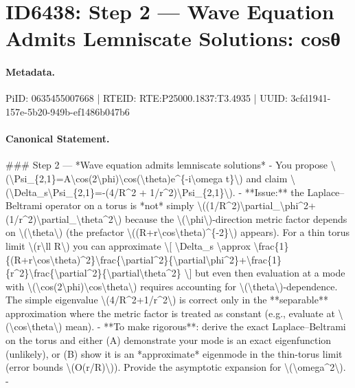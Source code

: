 \section*{ID6438: Step 2 — Wave Equation Admits Lemniscate Solutions: cosθ}
\paragraph{Metadata.}
PiID: 0635455007668 | RTEID: RTE:P25000.1837:T3.4935 | UUID: 3cfd1941-157e-5b20-949b-ef1486b047b6

\paragraph{Canonical Statement.}
\#\#\# Step 2 — *Wave equation admits lemniscate solutions* - You propose \textbackslash{}(\textbackslash{}Psi\_\{2,1\}=A\textbackslash{}cos(2\textbackslash{}phi)\textbackslash{}cos(\textbackslash{}theta)e\textasciicircum{}\{-i\textbackslash{}omega t\}\textbackslash{}) and claim \textbackslash{}(\textbackslash{}Delta\_s\textbackslash{}Psi\_\{2,1\}=-(4/R\textasciicircum{}2 + 1/r\textasciicircum{}2)\textbackslash{}Psi\_\{2,1\}\textbackslash{}). - **Issue:** the Laplace–Beltrami operator on a torus is *not* simply \textbackslash{}((1/R\textasciicircum{}2)\textbackslash{}partial\_\textbackslash{}phi\textasciicircum{}2+(1/r\textasciicircum{}2)\textbackslash{}partial\_\textbackslash{}theta\textasciicircum{}2\textbackslash{}) because the \textbackslash{}(\textbackslash{}phi\textbackslash{})-direction metric factor depends on \textbackslash{}(\textbackslash{}theta\textbackslash{}) (the prefactor \textbackslash{}((R+r\textbackslash{}cos\textbackslash{}theta)\textasciicircum{}\{-2\}\textbackslash{}) appears). For a thin torus limit \textbackslash{}(r\textbackslash{}ll R\textbackslash{}) you can approximate \textbackslash{}[ \textbackslash{}Delta\_s \textbackslash{}approx \textbackslash{}frac\{1\}\{(R+r\textbackslash{}cos\textbackslash{}theta)\textasciicircum{}2\}\textbackslash{}frac\{\textbackslash{}partial\textasciicircum{}2\}\{\textbackslash{}partial\textbackslash{}phi\textasciicircum{}2\}+\textbackslash{}frac\{1\}\{r\textasciicircum{}2\}\textbackslash{}frac\{\textbackslash{}partial\textasciicircum{}2\}\{\textbackslash{}partial\textbackslash{}theta\textasciicircum{}2\} \textbackslash{}] but even then evaluation at a mode with \textbackslash{}(\textbackslash{}cos(2\textbackslash{}phi)\textbackslash{}cos\textbackslash{}theta\textbackslash{}) requires accounting for \textbackslash{}(\textbackslash{}theta\textbackslash{})-dependence. The simple eigenvalue \textbackslash{}(4/R\textasciicircum{}2+1/r\textasciicircum{}2\textbackslash{}) is correct only in the **separable** approximation where the metric factor is treated as constant (e.g., evaluate at \textbackslash{}(\textbackslash{}cos\textbackslash{}theta\textbackslash{}) mean). - **To make rigorous**: derive the exact Laplace–Beltrami on the torus and either (A) demonstrate your mode is an exact eigenfunction (unlikely), or (B) show it is an *approximate* eigenmode in the thin-torus limit (error bounds \textbackslash{}(O(r/R)\textbackslash{})). Provide the asymptotic expansion for \textbackslash{}(\textbackslash{}omega\textasciicircum{}2\textbackslash{}). - 
